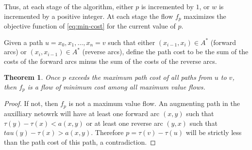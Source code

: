 \documentclass{amsbook}
\newtheorem{theorem}{Theorem}[section]
\theoremstyle{definition}
\theoremstyle{remark}
\begin{document}
Thus, at each stage of the algorithm, either $p$ is incremented by $1$, or $w$ is incremented by a positive integer.
At each stage the flow $f_p$ maximizes the objective function of \eqref{eq:min-cost} for the current value of $p$.

Given a path $u=x_0,x_1,\dotsc,x_n=v$ such that either $(x_{i-1},x_i)\in A^*$ (forward arcs) or $(x_i,x_{i-1})\in A^*$ (reverse arcs), define the path cost to be the sum of the costs of the forward arcs minus the sum of the costs of the reverse arcs.
\begin{theorem}
  Once $p$ exceeds the maximum path cost of all paths from $u$ to $v$, then $f_p$ is a flow of minimum cost among all maximum value flows.
\end{theorem}
\begin{proof}
  If not, then $f_p$ is not a maximum value flow.
  An augmenting path in the auxilliary netowrk will have at least one forward arc $(x,y)$ such that $\tau(y)-\tau(x)<a(x,y)$ or at least one reverse arc $(y,x)$ such that $tau(y)-\tau(x)>a(x,y)$.
  Therefore $p=\tau(v)-\tau(u)$ will be strictly less than the path cost of this path, a contradiction.
\end{proof}



\end{document}
